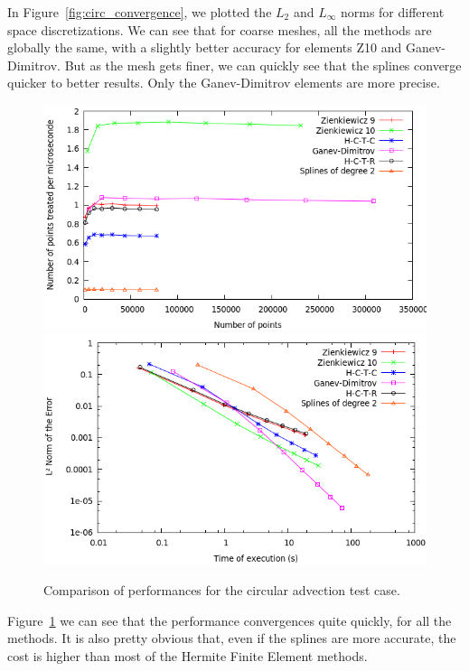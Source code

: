 \documentclass[proc]{edpsmath}
\begin{document}
In Figure~\ref{fig:circ_convergence}, we plotted the $L_2$ and $L_\infty$ norms for different space discretizations. We can see that for coarse meshes, all the methods are globally the same, with a slightly better accuracy for elements Z10 and Ganev-Dimitrov. But as the mesh gets finer, we can quickly see that the splines converge quicker to better results. Only the Ganev-Dimitrov elements are more precise. 

\begin{figure}[h!]
	\includegraphics[scale=0.35]{figures/efficiency.png}
	\includegraphics[scale=0.35]{figures/time_norm.png}
	\caption{Comparison of performances for the circular advection test case.}
	\label{fig:circ_performance}
\end{figure}

Figure~\ref{fig:circ_performance} we can see that the performance convergences quite quickly, for all the methods. It is also pretty obvious that, even if the splines are more accurate, the cost is higher than most of the Hermite Finite Element methods.
\end{document}
